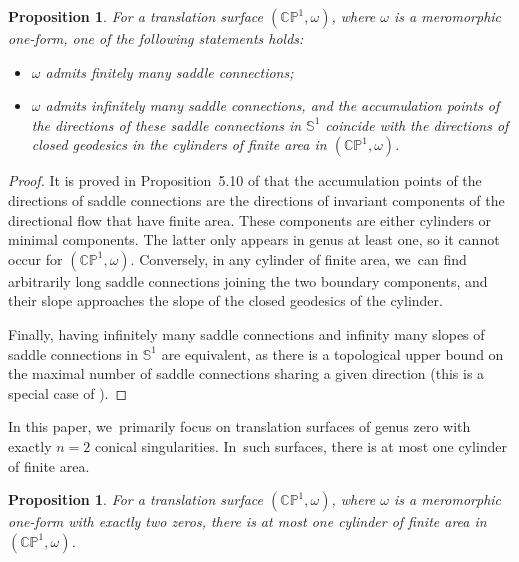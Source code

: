 \documentclass[JEP,XML,SOM,Unicode,NoFloatCountersInSection,published]{cedram}
\newtheorem{prop}[thm]{Proposition}
\theoremstyle{definition}
\begin{document}
\begin{prop}\label{prop:INFINITE-SC-Chara}
For a translation surface $(\mathbb{CP}^{1},\omega)$, where $\omega$ is a meromorphic one-form, one of the following statements holds:
\begin{itemize}
\item $\omega$ admits finitely many saddle connections;
\item $\omega$ admits infinitely many saddle connections, and the accumulation points of the directions of these saddle connections in $\mathbb{S}^{1}$ coincide with the directions of closed geodesics in the cylinders of finite area in $(\mathbb{CP}^{1},\omega)$.
\end{itemize}
\end{prop}

\begin{proof}
It is proved in Proposition~5.10 of \cite{tahar} that the accumulation points of the directions of saddle connections are the directions of invariant components of the directional flow that have finite area. These components are either cylinders or minimal components. The latter only appears in genus at least one, so it cannot occur for $(\mathbb{CP}^{1},\omega)$. Conversely, in any cylinder of finite area, we~can find arbitrarily long saddle connections joining the two boundary components, and their slope approaches the slope of the closed geodesics of the cylinder.

Finally, having infinitely many saddle connections and infinity many slopes of saddle connections in $\mathbb{S}^{1}$ are equivalent, as there is a topological upper bound on the maximal number of saddle connections sharing a given direction (this is a special case of \cite[Prop.\,7.6]{tahar}).
\end{proof}

In this paper, we~primarily focus on translation surfaces of genus zero with exactly $n=2$ conical singularities. In~such surfaces, there is at most one cylinder of finite area.

\begin{prop}
For a translation surface $(\mathbb{CP}^{1},\omega)$, where $\omega$ is a meromorphic one-form with exactly two zeros, there is at most one cylinder of finite area in $(\mathbb{CP}^{1},\omega)$.
\end{prop}
\end{document}
